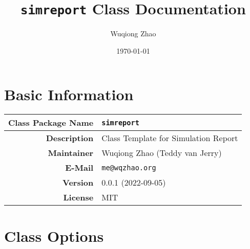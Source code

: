 \documentclass[10pt]{simreport}
\title{\texttt{simreport} Class Documentation}
\author{Wuqiong Zhao}
\date{\today{}}
\begin{document}
  \maketitle

  \section{Basic Information}

  \begin{table}[h]
    \renewcommand{\arraystretch}{1.3}
    \begin{tabularx}{\linewidth}{>{\bfseries\arraybackslash}r|X}
      \toprule
        Class Package Name & \texttt{simreport} \\\hline
        Description & Class Template for Simulation Report \\\hline
        Maintainer & Wuqiong Zhao (Teddy van Jerry) \\\hline
        E-Mail & \texttt{me@wqzhao.org} \\\hline
        Version & 0.0.1 (2022-09-05) \\\hline
        License & MIT \\
      \bottomrule
    \end{tabularx}
  \end{table}

  \section{Class Options}
\end{document}
